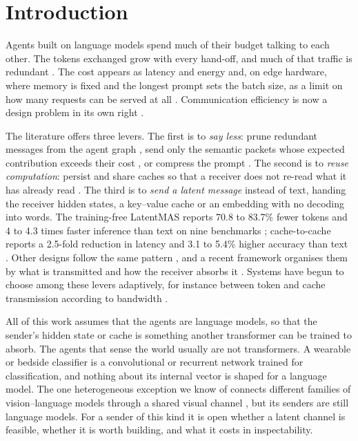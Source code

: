\section{Introduction}
\label{sec:intro}

Agents built on language models spend much of their budget talking to each other. The tokens exchanged grow with every hand-off, and much of that traffic is redundant \cite{zhang2024cut}. The cost appears as latency and energy and, on edge hardware, where memory is fixed and the longest prompt sets the batch size, as a limit on how many requests can be served at all \cite{zheng2025areview,shkolnikov2026agentmemory}. Communication efficiency is now a design problem in its own right \cite{aei2026survey}.

The literature offers three levers. The first is to \emph{say less}: prune redundant messages from the agent graph \cite{zhang2024cut}, send only the semantic packets whose expected contribution exceeds their cost \cite{dong2026bandmas}, or compress the prompt \cite{mu2023gist,ge2024icae,cheng2024xrag,jiang2023llmlingua}. The second is to \emph{reuse computation}: persist and share caches so that a receiver does not re-read what it has already read \cite{shkolnikov2026agentmemory}. The third is to \emph{send a latent message} instead of text, handing the receiver hidden states, a key--value cache or an embedding with no decoding into words. The training-free LatentMAS reports 70.8 to 83.7\% fewer tokens and 4 to 4.3 times faster inference than text on nine benchmarks \cite{zou2025latent}; cache-to-cache reports a 2.5-fold reduction in latency and 3.1 to 5.4\% higher accuracy than text \cite{fu2025cachetocache}. Other designs follow the same pattern \cite{pham2024ciphers,du2026enabling,zheng2025thought,rossi2026latentcacheflow,flamant2026bicameral,jin2026agentprimitives}, and a recent framework organises them by what is transmitted and how the receiver absorbs it \cite{liu2026beyondtokens}. Systems have begun to choose among these levers adaptively, for instance between token and cache transmission according to bandwidth \cite{dai2026tokenkv}.

All of this work assumes that the agents are language models, so that the sender's hidden state or cache is something another transformer can be trained to absorb. The agents that sense the world usually are not transformers. A wearable or bedside classifier is a convolutional or recurrent network trained for classification, and nothing about its internal vector is shaped for a language model. The one heterogeneous exception we know of connects different families of vision--language models through a shared visual channel \cite{liu2026visionwormhole}, but its senders are still language models. For a sender of this kind it is open whether a latent channel is feasible, whether it is worth building, and what it costs in inspectability.

